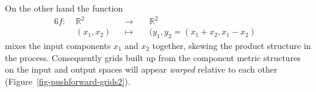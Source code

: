 \documentclass[
  letterpaper,
  DIV=11,
  numbers=noendperiod]{scrartcl}
\begin{document}
On the other hand the function \begin{alignat*}{6}
f :\; & \mathbb{R}^{2} & &\rightarrow& \; & \mathbb{R}^{2} &
\\
& (x_{1}, x_{2}) & &\mapsto& & (y_{1}, y_{2} = (x_{1} + x_{2}, x_{1} - x_{2}) &
\end{alignat*} mixes the input components \(x_{1}\) and \(x_{2}\)
together, skewing the product structure in the process. Consequently
grids built up from the component metric structures on the input and
output spaces will appear \emph{warped} relative to each other
(Figure~\ref{fig-pushforward-grids2}).

\begin{figure}

\begin{minipage}[t]{0.05\linewidth}

{\centering 

~

}

\end{minipage}%
%
\begin{minipage}[t]{0.90\linewidth}

{\centering 


}

\subcaption{\label{fig-pushforward-grids1}}
\end{minipage}%
%
\begin{minipage}[t]{0.05\linewidth}

{\centering 

~

}

\end{minipage}%
\newline
\begin{minipage}[t]{0.05\linewidth}


\end{minipage}
\end{figure}
\end{document}
